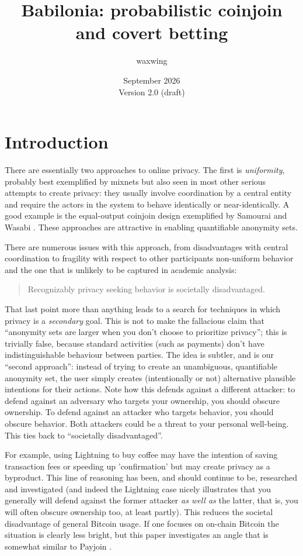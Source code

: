 \documentclass[11pt]{article}
\title{\textbf{Babilonia: probabilistic coinjoin and covert betting}}
\author{waxwing}
\date{September 2026 \\ \medskip Version 2.0 (draft)}
\begin{document}
\maketitle

\tableofcontents

\section{Introduction}

There are essentially two approaches to online privacy. The first is \emph{uniformity}, probably best exemplified by mixnets \cite{chaum1981} but also seen in most other serious attempts to create privacy: they usually involve coordination by a central entity and require the actors in the system to behave identically or near-identically. A good example is the equal-output coinjoin design exemplified by Samourai and Wasabi \cite{zerolink,wabisabi}. These approaches are attractive in enabling quantifiable anonymity sets.

There are numerous issues with this approach, from disadvantages with central coordination to fragility with respect to other participants non-uniform behavior and the one that is unlikely to be captured in academic analysis:

\begin{quote}
Recognizably privacy seeking behavior is societally disadvantaged.
\end{quote}

That last point more than anything leads to a search for techniques in which privacy is a \emph{secondary} goal. This is not to make the fallacious claim that ``anonymity sets are larger when you don't choose to prioritize privacy''; this is trivially false, because standard activities (such as payments) don't have indistinguishable behaviour between parties. The idea is subtler, and is our ``second approach'': instead of trying to create an unambiguous, quantifiable anonymity set, the user simply creates (intentionally or not) alternative plausible intentions for their actions. Note how this defends against a different attacker: to defend against an adversary who targets your ownership, you should obscure ownership. To defend against an attacker who targets behavior, you should obscure behavior. Both attackers could be a threat to your personal well-being. This ties back to ``societally disadvantaged''.

For example, using Lightning \cite{lightning} to buy coffee may have the intention of saving transaction fees or speeding up 'confirmation' but may create privacy as a byproduct. This line of reasoning has been, and should continue to be, researched and investigated (and indeed the Lightning case nicely illustrates that you generally will defend against the former attacker \emph{as well as} the latter, that is, you will often obscure ownership too, at least partly). This reduces the societal disadvantage of general Bitcoin usage. If one focuses on on-chain Bitcoin the situation is clearly less bright, but this paper investigates an angle that is somewhat similar to Payjoin \cite{payjoin}.
\end{document}

